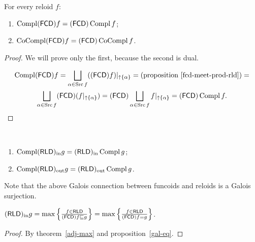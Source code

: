 \begin{thm}
  For every reloid $f$:
  \begin{enumerate}
    \item $\operatorname{Compl} (\mathsf{FCD}) f = (\mathsf{FCD})
    \operatorname{Compl} f$;
    \item $\operatorname{CoCompl} (\mathsf{FCD}) f = (\mathsf{FCD})
    \operatorname{CoCompl} f$.
  \end{enumerate}
\end{thm}

\begin{proof}
We will prove only the first, because the second is dual.

\begin{multline*}
\Compl (\mathsf{FCD}) f = \bigsqcup_{\alpha \in \Src f}
((\mathsf{FCD}) f) |_{\uparrow \{ \alpha \}} =
\text{(proposition~\ref{fcd-meet-prod-rld})} = \\
\bigsqcup_{\alpha \in \Src f} (\mathsf{FCD})
(f|_{\uparrow \{ \alpha \}}) = (\mathsf{FCD}) \bigsqcup_{\alpha \in
\Src f} f|_{\uparrow \{ \alpha \}} = (\mathsf{FCD})
\Compl f.
\end{multline*}  
\end{proof}

\begin{conjecture}
  ~
  \begin{enumerate}
  \item $\operatorname{Compl}(\mathsf{RLD})_{\mathrm{in}} g=(\mathsf{RLD})_{\mathrm{in}}\operatorname{Compl} g$;
  \item $\operatorname{Compl}(\mathsf{RLD})_{\mathrm{out}} g=(\mathsf{RLD})_{\mathrm{out}}\operatorname{Compl} g$.
  \end{enumerate}
\end{conjecture}

Note that the above Galois connection between funcoids and reloids is a Galois surjection.

\begin{prop}
$(\mathsf{RLD})_{\mathrm{in}} g =
\max \left\{ \frac{ f \in \mathsf{RLD} }{ (\mathsf{FCD}) f \sqsubseteq g }\right\} =
\max \left\{ \frac{ f \in \mathsf{RLD} }{ (\mathsf{FCD}) f = g }\right\}$.
\end{prop}

\begin{proof}
By theorem~\ref{adj-max} and proposition~\ref{gal-eq}.
\end{proof}

